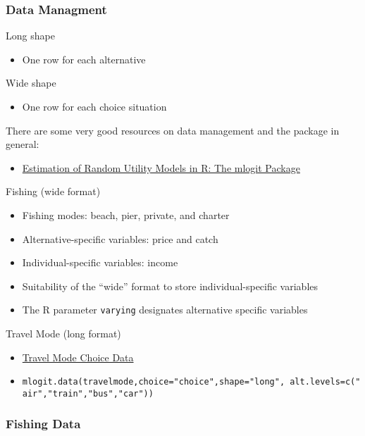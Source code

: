 \documentclass[
]{article}
\providecommand{\tightlist}{%
  \setlength{\itemsep}{0pt}\setlength{\parskip}{0pt}}
\begin{document}
\hypertarget{data-managment}{%
\subsubsection{Data Managment}\label{data-managment}}

Long shape

\begin{itemize}
\tightlist
\item
  One row for each alternative
\end{itemize}

Wide shape

\begin{itemize}
\tightlist
\item
  One row for each choice situation
\end{itemize}

There are some very good resources on data management and the package in general:

\begin{itemize}
\tightlist
\item
  \href{http://dx.doi.org/10.18637/jss.v095.i11}{Estimation of Random Utility Models in R: The mlogit Package}
\end{itemize}

Fishing (wide format)

\begin{itemize}
\tightlist
\item
  Fishing modes: beach, pier, private, and charter
\item
  Alternative-specific variables: price and catch
\item
  Individual-specific variables: income
\item
  Suitability of the ``wide'' format to store individual-specific variables
\item
  The R parameter \texttt{varying} designates alternative specific variables
\end{itemize}

Travel Mode (long format)

\begin{itemize}
\tightlist
\item
  \href{https://rdrr.io/cran/AER/man/TravelMode.html}{Travel Mode Choice Data}
\item
  \texttt{mlogit.data(travelmode,choice="choice",shape="long",\ alt.levels=c("air","train","bus","car"))}
\end{itemize}

\hypertarget{fishing-data}{%
\subsubsection{Fishing Data}\label{fishing-data}}
\end{document}
